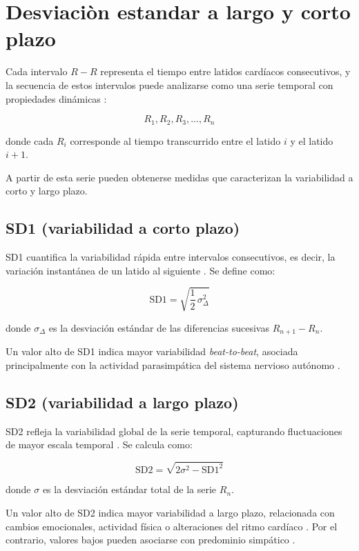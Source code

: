 \section{Desviaci\`on estandar a largo y corto plazo}
Cada intervalo $R - R$ representa el tiempo entre latidos cardíacos consecutivos, y la secuencia de 
estos intervalos puede analizarse como una serie temporal con propiedades dinámicas \cite{Tayel2015}:

\[
R_1, R_2, R_3, \ldots, R_n
\]

donde cada $R_i$ corresponde al tiempo transcurrido entre el latido $i$ y el latido $i + 1$.

A partir de esta serie pueden obtenerse medidas que caracterizan la variabilidad a corto y largo plazo.

\subsection*{SD1 (variabilidad a corto plazo)}

SD1 cuantifica la variabilidad rápida entre intervalos consecutivos, es decir, la variación instantánea 
de un latido al siguiente \cite{RodriguezBenitez2016}. Se define como:

\[
\text{SD1} = \sqrt{\frac{1}{2} \, \sigma_{\Delta}^2}
\tag{1}
\]

donde $\sigma_{\Delta}$ es la desviación estándar de las diferencias sucesivas $R_{n+1} - R_n$.

Un valor alto de SD1 indica mayor variabilidad \textit{beat-to-beat}, asociada principalmente con la actividad 
parasimpática del sistema nervioso autónomo \cite{Almirall1995, Jimenez2020}.

\subsection*{SD2 (variabilidad a largo plazo)}

SD2 refleja la variabilidad global de la serie temporal, capturando fluctuaciones de mayor escala temporal 
\cite{RodriguezBenitez2016}. Se calcula como:

\[
\text{SD2} = \sqrt{2\sigma^2 - \text{SD1}^2}
\tag{2}
\]

donde $\sigma$ es la desviación estándar total de la serie $R_n$.

Un valor alto de SD2 indica mayor variabilidad a largo plazo, relacionada con cambios emocionales, actividad 
física o alteraciones del ritmo cardíaco \cite{Veloza2019}. Por el contrario, valores bajos pueden asociarse 
con predominio simpático \cite{Jimenez2020}.
